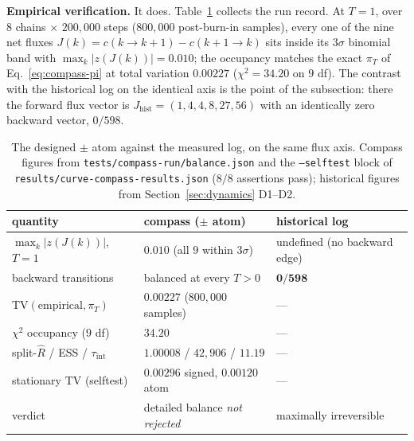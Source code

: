 \documentclass[11pt,a4paper]{article}
\theoremstyle{plain}
\theoremstyle{remark}
\theoremstyle{plain}
\begin{document}
\textbf{Empirical verification.} It does. Table~\ref{tab:compass} collects the
run record. At $T=1$, over $8$ chains $\times$ $200{,}000$ steps ($800{,}000$
post-burn-in samples), every one of the nine net fluxes
$J(k)=c(k\to k{+}1)-c(k{+}1\to k)$ sits inside its $3\sigma$ binomial band with
$\max_k|z(J(k))|=0.010$; the occupancy matches the exact $\pi_T$ of
Eq.~\eqref{eq:compass-pi} at total variation $0.00227$ ($\chi^2=34.20$ on $9$ df).
The contrast with the historical log on the identical axis is the point of the
subsection: there the forward flux vector is $J_{\mathrm{hist}}=(1,4,4,8,27,56)$
with an identically zero backward vector, $0/598$.

\begin{table}[t]
\centering
\small
\begin{tabular}{lll}
\toprule
quantity & compass ($\pm$ atom) & historical log \\
\midrule
$\max_k|z(J(k))|$, $T=1$        & $0.010$ (all $9$ within $3\sigma$)  & undefined (no backward edge) \\
backward transitions            & balanced at every $T>0$             & $\mathbf{0/598}$ \\
$\mathrm{TV}(\text{empirical},\pi_T)$ & $0.00227$ ($800{,}000$ samples) & --- \\
$\chi^2$ occupancy ($9$ df)     & $34.20$                             & --- \\
split-$\hat R$ / ESS / $\tau_{\mathrm{int}}$ & $1.00008$ / $42{,}906$ / $11.19$ & --- \\
stationary $\mathrm{TV}$ (selftest) & $0.00296$ signed, $0.00120$ atom & --- \\
verdict                         & detailed balance \emph{not rejected} & maximally irreversible \\
\bottomrule
\end{tabular}
\caption{The designed $\pm$ atom against the measured log, on the same flux axis.
Compass figures from \texttt{tests/compass-run/balance.json} and the
\texttt{--selftest} block of \texttt{results/curve-compass-results.json}
($8/8$ assertions pass); historical figures from Section~\ref{sec:dynamics} D1--D2.}
\label{tab:compass}
\end{table}
\end{document}
